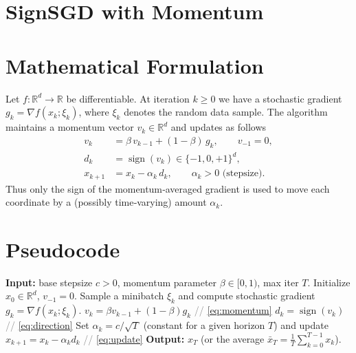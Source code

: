 \documentclass{article}
\newcommand{\sign}{\operatorname{sign}}
\newcommand{\R}{\mathbb{R}}
\begin{document}
\section*{SignSGD with Momentum}

\section*{Mathematical Formulation}
Let $f:\R^{d}\rightarrow\R$ be differentiable.  
At iteration $k\ge 0$ we have a stochastic gradient $g_{k}= \nabla f(x_{k};\xi_{k})$, where $\xi_{k}$ denotes the random data sample.  
The algorithm maintains a momentum vector $v_{k}\in\R^{d}$ and updates as follows
\begin{align}
v_{k} &= \beta\,v_{k-1} + (1-\beta)\,g_{k},\qquad v_{-1}=0,\label{eq:momentum}\\[2mm]
d_{k} &= \sign(v_{k})\in\{-1,0,+1\}^{d},\label{eq:direction}\\[2mm]
x_{k+1} &= x_{k} - \alpha_{k}\, d_{k}, \qquad \alpha_{k}>0 \text{ (stepsize).}\label{eq:update}
\end{align}
Thus only the sign of the momentum‑averaged gradient is used to move each coordinate by a (possibly time‑varying) amount $\alpha_{k}$.

\section*{Pseudocode}
\begin{algorithm}[H]
\caption{SignSGD with Momentum}
\begin{algorithmic}[1]
\STATE \textbf{Input:} base stepsize $c>0$, momentum parameter $\beta\in[0,1)$, max iter $T$.
\STATE Initialize $x_{0}\in\R^{d}$, $v_{-1}=0$.
    \STATE Sample a minibatch $\xi_{k}$ and compute stochastic gradient $g_{k}= \nabla f(x_{k};\xi_{k})$.
    \STATE $v_{k}= \beta v_{k-1} + (1-\beta) g_{k}$ \hfill \textcolor{gray}{// \eqref{eq:momentum}}
    \STATE $d_{k}= \sign(v_{k})$ \hfill \textcolor{gray}{// \eqref{eq:direction}}
    \STATE Set $\alpha_{k}=c/\sqrt{T}$ (constant for a given horizon $T$) and update
          $x_{k+1}= x_{k} - \alpha_{k} d_{k}$ \hfill \textcolor{gray}{// \eqref{eq:update}}
\ENDFOR
\STATE \textbf{Output:} $x_{T}$ (or the average $\bar x_{T}= \frac1T\sum_{k=0}^{T-1}x_{k}$).
\end{algorithmic}
\end{algorithm}
\end{document}

